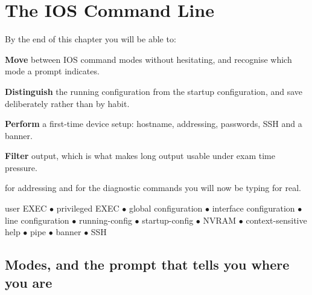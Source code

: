 \chapter{The IOS Command Line}\label{ch:cli}

\begin{outcomes}
By the end of this chapter you will be able to:
\begin{tight}
  \item \textbf{Move} between IOS command modes without hesitating, and recognise
        which mode a prompt indicates.
  \item \textbf{Distinguish} the running configuration from the startup
        configuration, and save deliberately rather than by habit.
  \item \textbf{Perform} a first-time device setup: hostname, addressing,
        passwords, SSH and a banner.
  \item \textbf{Filter}  output, which is what makes long output usable
        under exam time pressure.
\end{tight}
\end{outcomes}

\begin{prereq}
 for addressing and  for the diagnostic commands
you will now be typing for real.
\end{prereq}

\begin{keyterms}
user EXEC $\bullet$ privileged EXEC $\bullet$ global configuration $\bullet$
interface configuration $\bullet$ line configuration $\bullet$ running-config
$\bullet$ startup-config $\bullet$ NVRAM $\bullet$ context-sensitive help
$\bullet$ pipe $\bullet$ banner $\bullet$ SSH
\end{keyterms}

\section{Modes, and the prompt that tells you where you are}

